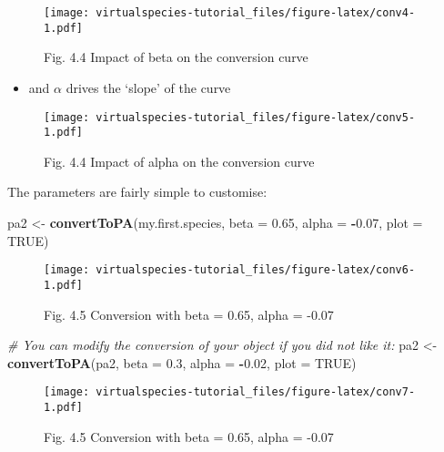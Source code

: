 \documentclass[]{article}
\newenvironment{Shaded}{\begin{snugshade}}{\end{snugshade}}
\newcommand{\KeywordTok}[1]{\textcolor[rgb]{0.13,0.29,0.53}{\textbf{#1}}}
\newcommand{\DataTypeTok}[1]{\textcolor[rgb]{0.13,0.29,0.53}{#1}}
\newcommand{\FloatTok}[1]{\textcolor[rgb]{0.00,0.00,0.81}{#1}}
\newcommand{\StringTok}[1]{\textcolor[rgb]{0.31,0.60,0.02}{#1}}
\newcommand{\CommentTok}[1]{\textcolor[rgb]{0.56,0.35,0.01}{\textit{#1}}}
\newcommand{\OtherTok}[1]{\textcolor[rgb]{0.56,0.35,0.01}{#1}}
\newcommand{\OperatorTok}[1]{\textcolor[rgb]{0.81,0.36,0.00}{\textbf{#1}}}
\newcommand{\NormalTok}[1]{#1}
\providecommand{\tightlist}{%
  \setlength{\itemsep}{0pt}\setlength{\parskip}{0pt}}
\begin{document}
\begin{figure}
\centering
\texttt{[image: virtualspecies-tutorial\_files/figure-latex/conv4-1.pdf]}
\caption{Fig. 4.4 Impact of beta on the conversion curve}
\end{figure}

\begin{itemize}
\tightlist
\item
  and \(\alpha\) drives the `slope' of the curve
\end{itemize}

\begin{figure}
\centering
\texttt{[image: virtualspecies-tutorial\_files/figure-latex/conv5-1.pdf]}
\caption{Fig. 4.4 Impact of alpha on the conversion curve}
\end{figure}

The parameters are fairly simple to customise:

\begin{Shaded}
\begin{Highlighting}[]
\NormalTok{pa2 <-}\StringTok{ }\KeywordTok{convertToPA}\NormalTok{(my.first.species,}
                   \DataTypeTok{beta =} \FloatTok{0.65}\NormalTok{, }\DataTypeTok{alpha =} \OperatorTok{-}\FloatTok{0.07}\NormalTok{,}
                   \DataTypeTok{plot =} \OtherTok{TRUE}\NormalTok{)}
\end{Highlighting}
\end{Shaded}

\begin{figure}
\centering
\texttt{[image: virtualspecies-tutorial\_files/figure-latex/conv6-1.pdf]}
\caption{Fig. 4.5 Conversion with beta = 0.65, alpha = -0.07}
\end{figure}

\begin{Shaded}
\begin{Highlighting}[]
\CommentTok{# You can modify the conversion of your object if you did not like it:}
\NormalTok{pa2 <-}\StringTok{ }\KeywordTok{convertToPA}\NormalTok{(pa2,}
                   \DataTypeTok{beta =} \FloatTok{0.3}\NormalTok{, }\DataTypeTok{alpha =} \OperatorTok{-}\FloatTok{0.02}\NormalTok{,}
                   \DataTypeTok{plot =} \OtherTok{TRUE}\NormalTok{)}
\end{Highlighting}
\end{Shaded}

\begin{figure}
\centering
\texttt{[image: virtualspecies-tutorial\_files/figure-latex/conv7-1.pdf]}
\caption{Fig. 4.5 Conversion with beta = 0.65, alpha = -0.07}
\end{figure}
\end{document}

